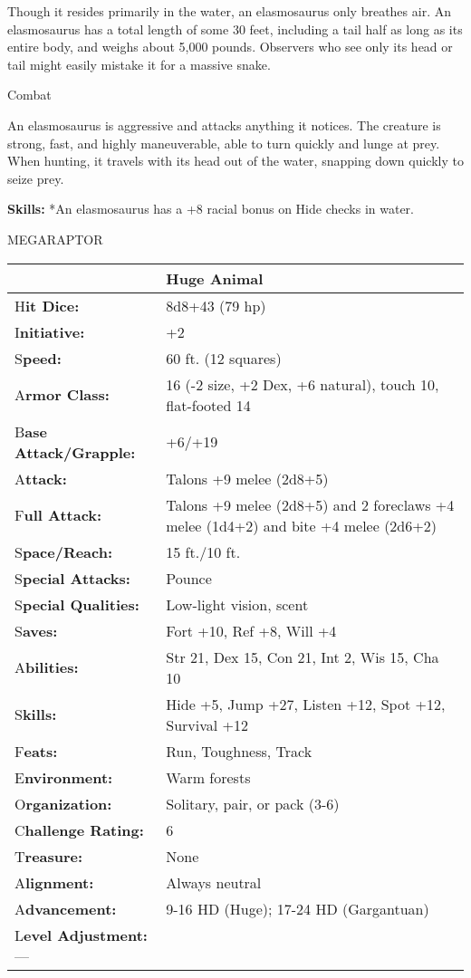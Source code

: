 \documentclass{article}
\begin{document}
Though it resides primarily in the water, an elasmosaurus only breathes air. An 
elasmosaurus has a total length of some 30 feet, including a tail half as long 
as its entire body, and weighs about 5,000 pounds. Observers who see only its head 
or tail might easily mistake it for a massive snake.

Combat

An elasmosaurus is aggressive and attacks anything it notices. The creature is 
strong, fast, and highly maneuverable, able to turn quickly and lunge at prey. 
When hunting, it travels with its head out of the water, snapping down quickly 
to seize prey.

\textbf{Skills:} *An elasmosaurus has a +8 racial bonus on Hide checks in water.

\vspace{12pt}
MEGARAPTOR

\begin{tabular}{|>{\raggedright}p{91pt}|>{\raggedright}p{231pt}|}
\hline
  & Huge Animal\tabularnewline
\hline
H\textbf{it Dice:} & 8d8+43 (79 hp)\tabularnewline
\hline
I\textbf{nitiative:} & +2\tabularnewline
\hline
S\textbf{peed:} & 60 ft. (12 squares)\tabularnewline
\hline
A\textbf{rmor Class:} & 16 (-2 size, +2 Dex, +6 natural), touch 10, flat-footed 
14\tabularnewline
\hline
B\textbf{ase Attack/Grapple:} & +6/+19\tabularnewline
\hline
A\textbf{ttack:} & Talons +9 melee (2d8+5)\tabularnewline
\hline
F\textbf{ull Attack:} & Talons +9 melee (2d8+5) and 2 foreclaws +4 melee (1d4+2) 
and bite +4 melee (2d6+2)\tabularnewline
\hline
S\textbf{pace/Reach:} & 15 ft./10 ft.\tabularnewline
\hline
S\textbf{pecial Attacks:} & Pounce\tabularnewline
\hline
S\textbf{pecial Qualities:} & Low-light vision, scent\tabularnewline
\hline
S\textbf{aves:} & Fort +10, Ref +8, Will +4\tabularnewline
\hline
A\textbf{bilities:} & Str 21, Dex 15, Con 21, Int 2, Wis 15, Cha 10\tabularnewline
\hline
S\textbf{kills:} & Hide +5, Jump +27, Listen +12, Spot +12, Survival +12\tabularnewline
\hline
F\textbf{eats:} & Run, Toughness, Track\tabularnewline
\hline
E\textbf{nvironment:} & Warm forests\tabularnewline
\hline
O\textbf{rganization:} & Solitary, pair, or pack (3-6)\tabularnewline
\hline
C\textbf{hallenge Rating:} & 6\tabularnewline
\hline
T\textbf{reasure:} & None\tabularnewline
\hline
A\textbf{lignment:} & Always neutral\tabularnewline
\hline
A\textbf{dvancement:} & 9-16 HD (Huge); 17-24 HD (Gargantuan)\tabularnewline
\hline
L\textbf{evel Adjustment:}--- & \tabularnewline
\hline
\end{tabular}
\end{document}
